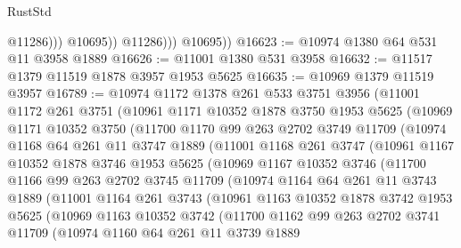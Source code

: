 \begin{lexlean}{RustStd}
\begin{coremodule}
                        @11286)))
                  @10695))
              @11286)))
        @10695))
@16623 := @10974 @1380 @64 @531 @11 @3958 @1889
@16626 := @11001 @1380 @531 @3958
@16632 := @11517 @1379 @11519 @1878 @3957 @1953 @5625
@16635 := @10969 @1379 @11519 @3957
@16789 := @10974
    @1172
    @1378
    @261
    @533
    @3751
    @3956
    (@11001
      @1172
      @261
      @3751
      (@10961
        @1171
        @10352
        @1878
        @3750
        @1953
        @5625
        (@10969
          @1171
          @10352
          @3750
          (@11700
            @1170
            @99
            @263
            @2702
            @3749
            @11709
            (@10974
              @1168
              @64
              @261
              @11
              @3747
              @1889
              (@11001
                @1168
                @261
                @3747
                (@10961
                  @1167
                  @10352
                  @1878
                  @3746
                  @1953
                  @5625
                  (@10969
                    @1167
                    @10352
                    @3746
                    (@11700
                      @1166
                      @99
                      @263
                      @2702
                      @3745
                      @11709
                      (@10974
                        @1164
                        @64
                        @261
                        @11
                        @3743
                        @1889
                        (@11001
                          @1164
                          @261
                          @3743
                          (@10961
                            @1163
                            @10352
                            @1878
                            @3742
                            @1953
                            @5625
                            (@10969
                              @1163
                              @10352
                              @3742
                              (@11700
                                @1162
                                @99
                                @263
                                @2702
                                @3741
                                @11709
                                (@10974
                                  @1160
                                  @64
                                  @261
                                  @11
                                  @3739
                                  @1889

\end{coremodule}
\end{lexlean}
